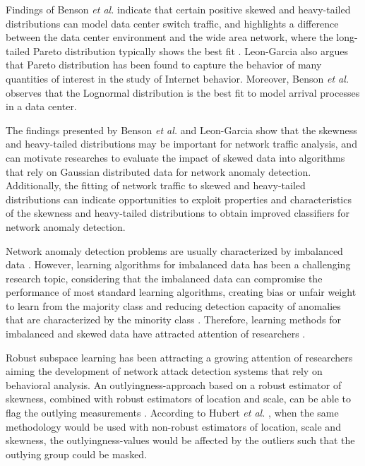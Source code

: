 Findings of Benson \emph{et al.}  \cite{benson2010network} indicate that certain positive skewed and heavy-tailed distributions can model data center switch traffic, and highlights a difference between the data center environment and the wide area network, where the long-tailed Pareto distribution typically shows the best fit \cite{benson2010network}. Leon-Garcia \cite{leon2017probability} also argues that Pareto distribution has been found to capture the behavior of many quantities of interest in the study of Internet behavior. Moreover, Benson \emph{et al.}  \cite{benson2010network} observes that the Lognormal distribution is the best fit to model arrival processes in a data center.

The findings presented by Benson \emph{et al.} \cite{benson2010network} and Leon-Garcia \cite{leon2017probability} show that the skewness and heavy-tailed distributions may be important for network traffic analysis, and can motivate researches to evaluate the impact of skewed data into algorithms that rely on Gaussian distributed data for network anomaly detection. Additionally, the fitting of network traffic to skewed and heavy-tailed distributions can indicate opportunities to exploit properties and characteristics of the skewness and heavy-tailed distributions to obtain improved classifiers for network anomaly detection.

Network anomaly detection problems are usually characterized by imbalanced data \cite{Phua2004minority}. However, learning algorithms for imbalanced data has been a challenging research topic, considering that the imbalanced data can compromise the performance of most standard learning algorithms, creating bias or unfair weight to learn from the majority class and reducing detection capacity of anomalies that are characterized by the minority class \cite{he2008learning}. Therefore, learning methods for imbalanced and skewed data have attracted attention of researchers \cite{hubert2009robustskewed}.

Robust subspace learning has been attracting a growing attention of researchers aiming the development of network attack detection systems \cite{pascoal2012robust, zhou2017anomaly} that rely on behavioral analysis. An outlyingness-approach based on a robust estimator of skewness, combined with robust estimators of location and scale, can be able to flag the outlying measurements \cite{hubert2009robustskewed}. According to Hubert \emph{et al.} \cite{hubert2009robustskewed}, when the same methodology would be used with non-robust estimators of location, scale and skewness, the outlyingness-values would be affected by the outliers such that the outlying group could be masked.


